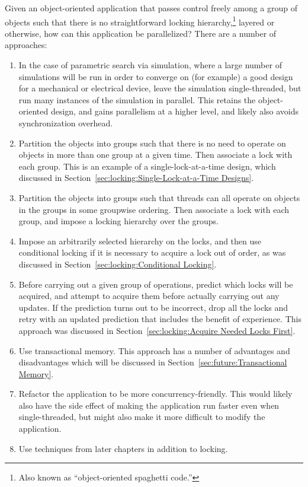 \begin{enumerate}
\QuickQ{}
	Given an object-oriented application that passes control freely
	among a group of objects such that there is no straightforward
	locking hierarchy,\footnote{
		Also known as ``object-oriented spaghetti code.''}
	layered or otherwise, how can this
	application be parallelized?
\QuickA{}
	There are a number of approaches:
	\begin{enumerate}
	\item	In the case of parametric search via simulation,
		where a large number of simulations will be run
		in order to converge on (for example) a good design
		for a mechanical or electrical device, leave the
		simulation single-threaded, but run many instances
		of the simulation in parallel.
		This retains the object-oriented design, and
		gains parallelism at a higher level, and likely
		also avoids synchronization overhead.
	\item	Partition the objects into groups such that there
		is no need to operate on objects in
		more than one group at a given time.
		Then associate a lock with each group.
		This is an example of a single-lock-at-a-time
		design, which discussed in
		Section~\ref{sec:locking:Single-Lock-at-a-Time Designs}.
	\item	Partition the objects into groups such that threads
		can all operate on objects in the groups in some
		groupwise ordering.
		Then associate a lock with each group, and impose a
		locking hierarchy over the groups.
	\item	Impose an arbitrarily selected hierarchy on the locks,
		and then use conditional locking if it is necessary
		to acquire a lock out of order, as was discussed in
		Section~\ref{sec:locking:Conditional Locking}.
	\item	Before carrying out a given group of operations, predict
		which locks will be acquired, and attempt to acquire them
		before actually carrying out any updates.
		If the prediction turns out to be incorrect, drop
		all the locks and retry with an updated prediction
		that includes the benefit of experience.
		This approach was discussed in
		Section~\ref{sec:locking:Acquire Needed Locks First}.
	\item	Use transactional memory.
		This approach has a number of advantages and disadvantages
		which will be discussed in
		Section~\ref{sec:future:Transactional Memory}.
	\item	Refactor the application to be more concurrency-friendly.
		This would likely also have the side effect of making
		the application run faster even when single-threaded, but might
		also make it more difficult to modify the application.
	\item	Use techniques from later chapters in addition to locking.
	\end{enumerate}


\end{enumerate}
